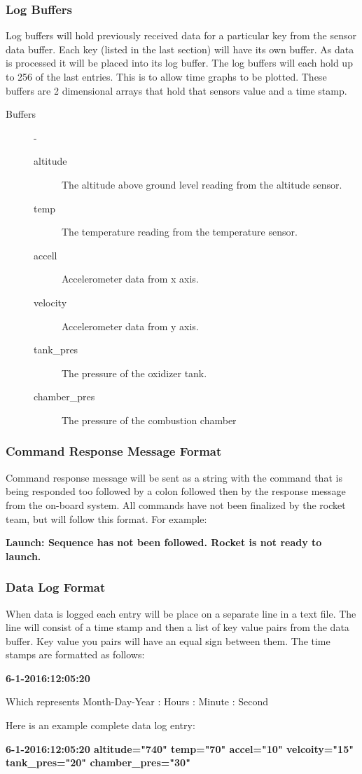 \documentclass[10pt,draftclsnofoot,onecolumn,retainorgcmds]{IEEEtran}
\begin{document}
\subsubsection{Log Buffers}
Log buffers will hold previously received data for a particular key from the sensor data buffer. Each key (listed in the last section) will have its own buffer. As data is processed it will be placed into its log buffer. The log buffers will each hold up to 256 of the last entries. This is to allow time graphs to be plotted. These buffers are 2 dimensional arrays that hold that sensors value and a time stamp.
\begin{description}
	\item[Buffers]  -
	\begin{description}
		\item[altitude] The altitude above ground level reading from the altitude sensor.
		\item[temp] The temperature reading from the temperature sensor.
		\item[accell] Accelerometer data from x axis.
		\item[velocity] Accelerometer data from y axis.
		\item[tank\_pres] The pressure of the oxidizer tank.
		\item[chamber\_pres] The pressure of the combustion chamber
	\end{description}
\end{description}

\subsubsection{Command Response Message Format}
Command response message will be sent as a string with the command that is being responded too followed by a colon followed then by the response message from the on-board system. All commands have not been finalized by the rocket team, but will follow this format.  For example: \par
{\bf Launch: Sequence has not been followed. Rocket is not ready to launch. } \par

\subsubsection{Data Log Format}
When data is logged each entry will be place on a separate line in a text file. The line will consist of a time stamp and then a list of key value pairs from the data buffer. Key value you pairs will have an equal sign between them. The time stamps are formatted as follows: \par 
{\bf 6-1-2016:12:05:20} \par
Which represents Month-Day-Year : Hours : Minute : Second \par
Here is an example complete data log entry: \par
{\bf 6-1-2016:12:05:20 altitude="740" temp="70" accel="10" velcoity="15" tank\_pres="20" chamber\_pres="30"}\par
\end{document}
